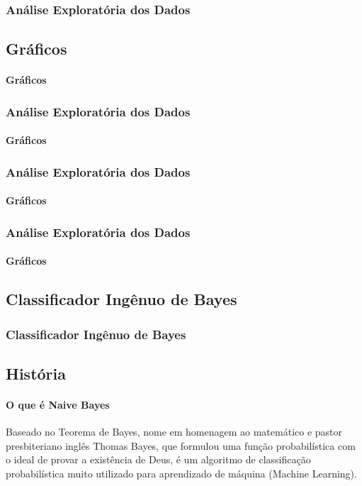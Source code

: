 \documentclass{beamer}
\begin{document}
\begin{frame}
\frametitle{Análise Exploratória dos Dados}
\subsection{Gráficos}
\framesubtitle{Gráficos}

\end{frame}


\begin{frame}
\frametitle{Análise Exploratória dos Dados}
\framesubtitle{Gráficos}



      
\end{frame}


\begin{frame}
    \frametitle{Análise Exploratória dos Dados}
    \framesubtitle{Gráficos}
    
          
\end{frame}
    
\begin{frame}
    \frametitle{Análise Exploratória dos Dados}
    \framesubtitle{Gráficos}
    
    
          
\end{frame}

\begin{frame}
    \section{Classificador Ingênuo de Bayes}
    \frametitle{Classificador Ingênuo de Bayes}
    \subsection{História}
    \framesubtitle{O que é Naive Bayes}
    
    Baseado no Teorema de Bayes, nome em homenagem ao matemático e pastor presbiteriano inglês Thomas Bayes, que formulou uma função probabilística com o ideal de provar a existência de Deus, é um algoritmo de classificação probabilística muito utilizado para aprendizado de máquina (Machine Learning).
    
\end{frame}
\end{document}
